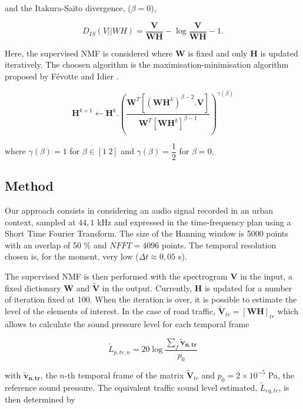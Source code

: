 \documentclass{article}
\begin{document}
\begin{sloppy}
and the Itakura-Saïto divergence, ($\beta = 0$), 
 
\begin{equation}\label{eq:divIS}
D_{IS}(V\vert\vert WH) = \frac{\mathbf{V}}{\mathbf{WH}} -\log\frac{\mathbf{V}}{\mathbf{WH}}-1.
\end{equation}

Here, the supervised NMF is considered where $\mathbf{W}$ is fixed and only $\mathbf{H}$ is updated iteratively. The choosen algorithm is the maximisation-minimisation algorithm proposed by F\'{e}votte and Idier \cite{fevotte2011}.

\begin{equation}
\mathbf{H}^{k+1} \longleftarrow \mathbf{H}^{k}.\left(\frac{\mathbf{W}^T\left[(\mathbf{WH}^{k})^{\beta-2}.\mathbf{V} \right]}{\mathbf{W}^T \left[ \mathbf{WH}^{k} \right]^{\beta-1}}\right)^{\gamma(\beta)}
\end{equation}

where $\gamma(\beta) = 1$ for $\beta \in [1~2]$ and $\gamma(\beta) = \dfrac{1}{2}$ for $\beta = 0$. 

\subsection{Method}

Our approach consists in considering an audio signal recorded in an urban context, sampled at $44,1$ kHz and expressed in the time-frequency plan using a Short Time Fourier Transform. The size of the Hanning window is 5000 points with an overlap of 50 \% and $NFFT = 4096$ points. The temporal resolution chosen is, for the moment, very low ($\Delta t \approx 0,05$ s). 

The supervised NMF is then performed with the spectrogram $\mathbf{V}$ in the input, a fixed dictionary $\mathbf{W}$ and $\mathbf{\tilde{V}}$ in the output. Currently, $\mathbf{H}$ is updated for a number of iteration fixed at 100. When the iteration is over, it is possible to estimate the level of the elements of interest. In the case of road traffic, $\mathbf{\tilde{V}}_{tr} = \left[\mathbf{WH}\right]_{tr}$ which allows to calculate the sound pressure level for each temporal frame

\begin{equation}\label{eq:Lp}
\tilde{L}_{p,tr,n} = 20\log\frac{\sum_f\mathbf{\mathbf{\tilde{v}}_{\mathbf{n},tr}}}{p_{0}}
\end{equation} 


with $\mathbf{\tilde{v}_{n,tr}}$, the $n$-th temporal frame of the matrix $\mathbf{\tilde{V}}_{tr}$ and $ p_{0} = 2\times 10^{-5}$ Pa, the reference sound pressure. The equivalent traffic sound level estimated, $\tilde{L}_{eq,tr}$, is then determined by


\end{sloppy}
\end{document}
